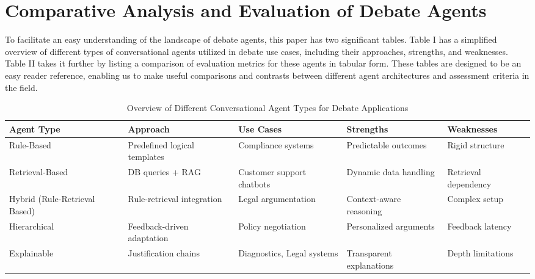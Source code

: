 \documentclass[conference]{IEEEtran}
\begin{document}
\section{Comparative Analysis and Evaluation of Debate Agents}
To facilitate an easy understanding of the landscape of debate agents, this paper has two significant tables. Table I has a simplified overview of different types of conversational agents utilized in debate use cases, including their approaches, strengths, and weaknesses. Table II takes it further by listing a comparison of evaluation metrics for these agents in tabular form. These tables are designed to be an easy reader reference, enabling us to make useful comparisons and contrasts between different agent architectures and assessment criteria in the field.
\begin{table}[ht]
    \centering
    \caption{Overview of Different Conversational Agent Types for Debate Applications}
    \label{tab:agents}
    \begin{tabular}{|>{\centering\arraybackslash}p{1.2cm}|>{\centering\arraybackslash}p{1.5cm}|>{\centering\arraybackslash}p{1.6cm}|>{\centering\arraybackslash}p{1.3cm}|>{\centering\arraybackslash}p{1.3cm}|}
    \hline
    \textbf{Agent Type}   & \textbf{Approach}                    & \textbf{Use Cases}                   & \textbf{Strengths}         & \textbf{Weaknesses}        \\ \hline
    Rule-Based           & Predefined logical templates                  & Compliance systems \cite{b12}        & Predictable outcomes       & Rigid structure            \\ \hline
    Retrieval-Based      & DB queries + RAG                      & Customer support chatbots \cite{rakshit2019debbie}  & Dynamic data handling      & Retrieval dependency       \\ \hline
    Hybrid (Rule-Retrieval Based)               & Rule-retrieval integration            & Legal argumentation \cite{kulatska2019arguebot}        & Context-aware reasoning    & Complex setup              \\ \hline
    Hierarchical         & Feedback-driven adaptation \cite{sakai2020hierarchical}  & Policy negotiation                   & Personalized arguments     & Feedback latency           \\ \hline
    Explainable          & Justification chains \cite{b13}       & Diagnostics, Legal systems           & Transparent explanations   & Depth limitations          \\ \hline
    \end{tabular}
\end{table}
\end{document}
